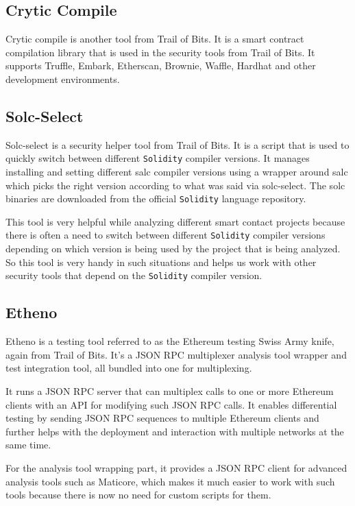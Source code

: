 \subsection{Crytic Compile}\label{crytic-compile}

Crytic compile is another tool from Trail of Bits. It is a smart
contract compilation library that is used in the security tools from
Trail of Bits. It supports Truffle, Embark, Etherscan, Brownie, Waffle,
Hardhat and other development environments.

\subsection{Solc-Select}\label{solc-select}

Solc-select is a security helper tool from Trail of Bits. It is a script
that is used to quickly switch between different \texttt{Solidity}
compiler versions. It manages installing and setting different salc
compiler versions using a wrapper around salc which picks the right
version according to what was said via solc-select. The solc binaries
are downloaded from the official \texttt{Solidity} language repository.

This tool is very helpful while analyzing different smart contact
projects because there is often a need to switch between different
\texttt{Solidity} compiler versions depending on which version is being
used by the project that is being analyzed. So this tool is very handy
in such situations and helps us work with other security tools that
depend on the \texttt{Solidity} compiler version.

\subsection{Etheno}\label{etheno}

Etheno is a testing tool referred to as the Ethereum testing Swiss Army
knife, again from Trail of Bits. It's a JSON RPC multiplexer analysis
tool wrapper and test integration tool, all bundled into one for
multiplexing.

It runs a JSON RPC server that can multiplex calls to one or more
Ethereum clients with an API for modifying such JSON RPC calls. It
enables differential testing by sending JSON RPC sequences to multiple
Ethereum clients and further helps with the deployment and interaction
with multiple networks at the same time.

For the analysis tool wrapping part, it provides a JSON RPC client for
advanced analysis tools such as Maticore, which makes it much easier to
work with such tools because there is now no need for custom scripts for
them.

